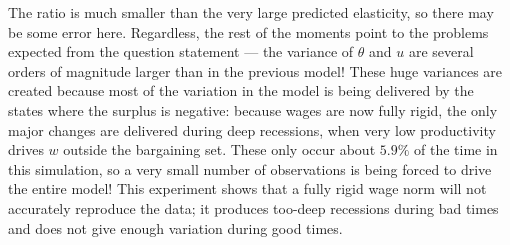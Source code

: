 \documentclass[12pt, letterpaper, parskip = full]{article}
\begin{document}
    The ratio is much smaller than the very large predicted elasticity, so there may be some error here. Regardless, the rest of the moments point to the problems expected from the question statement --- the variance of \(\theta\) and \(u\) are several orders of magnitude larger than in the previous model! These huge variances are created because most of the variation in the model is being delivered by the states where the surplus is negative: because wages are now fully rigid, the only major changes are delivered during deep recessions, when very low productivity drives \(w\) outside the bargaining set. These only occur about \(5.9\%\) of the time in this simulation, so a very small number of observations is being forced to drive the entire model! This experiment shows that a fully rigid wage norm will not accurately reproduce the data; it produces too-deep recessions during bad times and does not give enough variation during good times.
\end{document}
